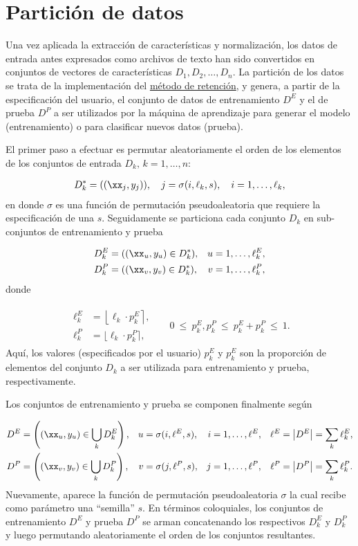 \section{Partición de datos}
Una vez aplicada la extracción de características y normalización, los
datos de entrada antes expresados como archivos de texto han sido
convertidos en conjuntos de vectores de características
$D_1,D_2,\ldots,D_n$.  La partición de los datos se trata de la
implementación del \hyperref[retencion]{método de retención}, y
genera, a partir de la especificación del usuario, el conjunto de
datos de entrenamiento $D^E$ y el de prueba $D^P$ a ser utilizados por
la máquina de aprendizaje para generar el modelo (entrenamiento) o
para clasificar nuevos datos (prueba).

El primer paso a efectuar es permutar aleatoriamente el orden de los
elementos de los conjuntos de entrada $D_k,\,k=1,\ldots,n$:

\begin{align*}
  D^*_k = ((\xx_j,y_j)), \quad j = \sigma(i,\ell_k,s), \quad i=1,\ldots,\ell_k,
\end{align*}
en donde $\sigma$ es una función de permutación pseudoaleatoria que
requiere la especificación de una  $s$. Seguidamente se
particiona cada conjunto $D_k$ en sub-conjuntos de entrenamiento
y prueba

\begin{align*}
  D^E_k &= ((\xx_u,y_u)\in D^*_k),& u&=1,\ldots,\ell^E_k, \\
  D^P_k &= ((\xx_v,y_v)\in D^*_k),& v&=1,\ldots,\ell^P_k,
\end{align*}
donde

\begin{align*}
  \begin{split}
    \ell^E_k &= \left\lfloor\ell_k\cdot p_k^E \right\rceil, \\
    \ell^P_k &= \lfloor\ell_k\cdot p_k^P\rceil,
  \end{split}
  &&
  0\ \leq\ p_k^E, p_k^P\ \leq\  p_k^E + p_k^P\ \leq\ 1.
\end{align*}
Aquí, los valores (especificados por el usuario) $p^E_k$ y $p^E_k$ son
la proporción de elementos del conjunto $D_k$ a ser utilizada para
entrenamiento y prueba, respectivamente.

Los conjuntos de entrenamiento y prueba se componen finalmente según

\begin{align*}
  D^E &= \left( (\xx_u,y_u) \in \bigcup_k {D}^E_k \right), &
  u &= \sigma(i,\ell^E,s), &
  i &= 1,\ldots,\ell^E, &
  \ell^E &= \left| D^E \right| = \sum_k \ell^E_k ,\\
  D^P &= \left( (\xx_v,y_v) \in \bigcup_k {D}^P_k \right), &
  v &= \sigma(j,\ell^P,s), &
  j &= 1,\ldots,\ell^P, &
  \ell^P &= \left| D^P \right| = \sum_k \ell^P_k .
\end{align*}
Nuevamente, aparece la función de permutación pseudoaleatoria $\sigma$
la cual recibe como parámetro una ``semilla'' $s$.
En términos coloquiales, los conjuntos de entrenamiento $D^E$ y prueba $D^P$
se arman concatenando los respectivos $D^E_k$ y $D^P_k$ y luego permutando
aleatoriamente el orden de los conjuntos resultantes.

